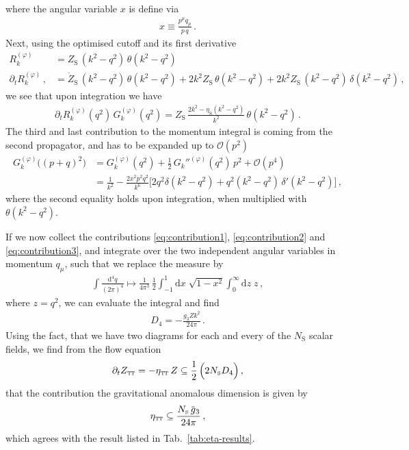 \documentclass[11pt]{book}
\newcommand{\overbar}[1]{\mkern 1.5mu\overline{\mkern-1.5mu#1\mkern-1.5mu}\mkern 1.5mu}
\newcommand\TTspace{ -1pt }
\newcommand\etaTT{ \eta_{\scriptscriptstyle{\mathrm{T\hspace{\TTspace}T}}} }
\newcommand\ZTT{ Z_{\scriptscriptstyle{\mathrm{T\hspace{\TTspace}T}}} }
\newcommand\etaS{ \eta_{\scriptscriptstyle{\mathrm{S}}} }
\newcommand\ZS{ Z_{\scriptscriptstyle{\mathrm{S}}} }
\newcommand\NS{ N_{\scriptscriptstyle{\mathrm{S}}} }
\numberwithin{equation}{chapter}
\begin{document}
\begin{appendices}
\begin{align}
  \label{eq:contribution1}
\end{align}
where the angular variable $x$ is define via
\begin{align}
  x \equiv  \frac{ p^\mu q_\mu }{ p \, q } \,.
\end{align}
Next, using the optimised cutoff and its first derivative
\begin{align}
  R_k^{(\varphi)}
  &= \ZS \, (k^2 - q^2) \, \theta (k^2 - q^2) \\
  \partial_t R_k^{(\varphi)} \,,
  &= \dot \ZS \, (k^2 - q^2) \, \theta (k^2 - q^2)
  + 2 k^2 \ZS \, \theta (k^2 - q^2)
  + 2 k^2 \ZS \, (k^2 - q^2) \, \delta (k^2 - q^2) \,,
\end{align}
we see that upon integration we have
\begin{align}
  \partial_t R_k^{(\varphi)}(q^2) \,
  G_k^{(\varphi)}(q^2)
  =
  \ZS \, \frac{ 2 k^2 - \etaS ( k^2 - q^2 ) }{ k^2 } \,
  \theta (k^2 - q^2)
  \,.
  \label{eq:contribution2}
\end{align}
The third and last contribution to the momentum integral
is coming from the second propagator, and has to be expanded up
to $\mathcal O(p^2)$
\begin{align}
  G_k^{(\varphi)} \big( (p+q)^2 \big)
  &=
  G_k^{(\varphi)} ( q^2 )
  + \frac{1}{2} \, G_k''^{(\varphi)} ( q^2 ) \, p^2
  + \mathcal O(p^4) \nonumber \\
  &=
  \frac{ 1 }{ k^2 }
  - \frac{ 2 x^2 p^2 q^2 }{ k^6 }
  \big[
    2 q^2 \delta (k^2 - q^2)
    + q^2 (k^2 - q^2) \, \delta' (k^2 - q^2)
  \big] \,,
  \label{eq:contribution3}
\end{align}
where the second equality holds upon integration, when multiplied
with $\theta (k^2 - q^2)$.

If we now collect the contributions
\eqref{eq:contribution1},
\eqref{eq:contribution2} and
\eqref{eq:contribution3},
and integrate over the two independent angular variables in
momentum $q_\mu$, such that we replace the measure by
\begin{align}
  \int \frac{\mathrm{d}^4q}{(2\pi)^4} \mapsto
  \frac{ 1 }{ 4 \pi^3 } \, \frac{1}{2}
  \int_{-1}^{1} \mathrm dx \; \sqrt{ 1-x^2 }
  \int_{0}^{\infty} \mathrm{d}z \; z \,,
\end{align}
where $z = q^2$, we can evaluate the integral and find
\begin{align}
  D_4 =
  - \frac{g_3 Z k^2}{ 24 \pi } \,.
\end{align}
Using the fact, that we have two diagrams for each and every of the
$\NS$ scalar fields, we find from the flow equation
\begin{align}
  \partial_t \ZTT = - \etaTT \, Z \subseteq
  \frac 12 \, \Big( 2 \NS D_4 \Big) \,,
\end{align}
that the contribution the gravitational anomalous dimension
is given by
\begin{align}
  \etaTT \subseteq
  \frac{\NS \, \overbar g_3 }{ 24 \pi } \,,
\end{align}
which agrees with the result listed in Tab.~\ref{tab:eta-results}.



\end{appendices}
\end{document}
